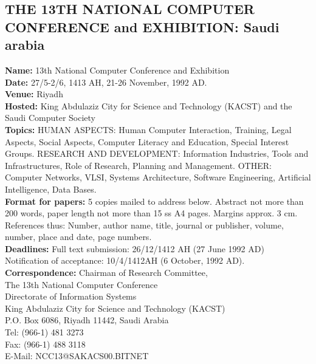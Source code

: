 \subsection{THE 13TH NATIONAL COMPUTER CONFERENCE and EXHIBITION: Saudi arabia}
{\bf Name:} 13th  National  Computer  Conference and Exhibition\\
{\bf Date:} 27/5-2/6, 1413 AH, 21-26 November, 1992 AD.\\
{\bf Venue:} Riyadh\\
{\bf Hosted:} King Abdulaziz City for Science and Technology (KACST)
and the Saudi Computer  Society\\
{\bf Topics:} HUMAN ASPECTS: Human Computer Interaction, Training,
Legal Aspects, Social Aspects, Computer Literacy and Education,
Special Interest Groups. RESEARCH AND DEVELOPMENT: Information
Industries, Tools and Infrastructures, Role of Research, Planning and
Management. OTHER: Computer Networks, VLSI, Systems Architecture,
Software Engineering, Artificial Intelligence, Data Bases.\\
{\bf Format for papers:} 5 copies mailed to address below. Abstract
not more than 200 words, paper length not more than 15 ss A4 pages.
Margins approx. 3 cm.  References thus: {Number}, author name, title,
journal or publisher, volume, number, place and date, page numbers.\\
{\bf Deadlines:} Full text submission: 26/12/1412 AH  (27 June 1992
AD)\\
Notification of acceptance: 10/4/1412AH (6 October, 1992 AD).\\
{\bf Correspondence:} Chairman of Research Committee,\\
The 13th National Computer Conference\\
Directorate of Information Systems\\
King Abdulaziz City for Science and Technology (KACST)\\
P.O. Box 6086, Riyadh 11442, Saudi Arabia\\
Tel:    (966-1) 481 3273\\
Fax:    (966-1) 488 3118\\
E-Mail: NCC13@SAKACS00.BITNET\\

